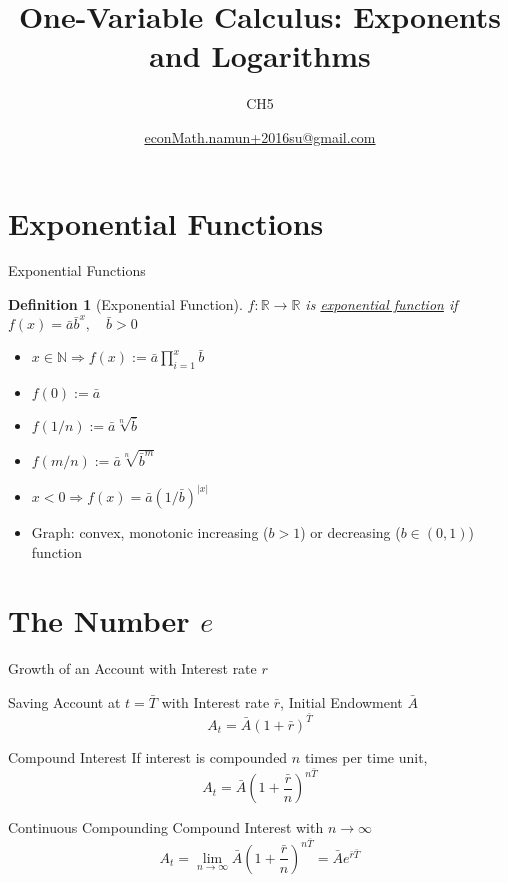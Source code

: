 \documentclass[final]{beamer}
\author[조남운]{\url{econMath.namun+2016su@gmail.com}}
\title{One-Variable Calculus: Exponents and Logarithms}
\subtitle{CH5}
\newtheorem{defn}{Definition}
\begin{document}
	
\maketitle


\section{Exponential Functions} %
\label{sec:exponential_functions}
\begin{frame}[t]{Exponential Functions}
	\begin{defn}
		[Exponential Function]
		$f:\mathbb{R}\rightarrow\mathbb{R}$ is \uline{exponential function} if $f(x)=\bar a \bar b^x,\quad \bar b>0$
	\end{defn}
	\begin{itemize}
		\item $x\in\mathbb{N}\Rightarrow f(x):=\bar a \prod_{i=1}^x \bar b$
		\item $f(0) := \bar a$
		\item $f(1/n):= \bar a \sqrt[n]{\bar b}$
		\item $f(m/n):= \bar a \sqrt[n]{\bar b^m}$
		\item $x<0 \Rightarrow f(x)=\bar a (1/\bar b)^{|x|}$
		\item Graph: convex, monotonic increasing ($b>1$) or decreasing ($b\in(0,1)$) function
	\end{itemize}
\end{frame}

\section{The Number $e$} %
\label{sec:the_number_e}
\begin{frame}[t]{Growth of an Account with Interest rate $r$}
	\begin{block}
		{Saving Account at $t=\bar T$ with Interest rate $\bar r$, Initial Endowment $\bar A$}
		\[
			A_t = \bar A \left(1+\bar r\right)^{\bar T}
		\]
	\end{block}
	\begin{block}
		{Compound Interest} If interest is compounded $n$ times per time unit, 
		\[
			A_t = \bar A \left(1+\frac{\bar r}{n}\right)^{n\bar T}
		\]
	\end{block}
	\begin{block}
		{Continuous Compounding} Compound Interest with $n\rightarrow \infty$
		\[
			A_t = \lim_{n\rightarrow \infty}\bar A \left(1+\frac{\bar r}{n}\right)^{n\bar T} = \bar A e^{\bar r\bar T}
		\]
	\end{block}
\end{frame}
\end{document}
